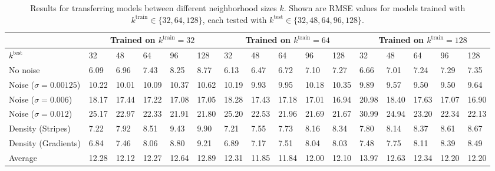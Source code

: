 \documentclass[10pt,twocolumn,letterpaper]{article}
\begin{document}
\begin{table*}[t]
\small
\setlength\tabcolsep{3.5pt}
\centering
\begin{tabular}{llllll|lllll|lllll}
\toprule
& \multicolumn{5}{c}{Trained on $k^{\textrm{train}} = 32$} & \multicolumn{5}{c}{Trained on $k^{\textrm{train}} = 64$} & \multicolumn{5}{c}{Trained on $k^{\textrm{train}} = 128$} \\
\midrule
$k^{\textrm{test}}$ & 32  &  48  & 64 & 96 & 128 & 32  &  48  & 64 & 96 & 128 & 32  &  48  & 64 & 96 & 128  \\ 
\midrule
No noise  & 6.09 &  6.96 & 7.43 & 8.25 & 8.77 & 6.13  & 6.47 & 6.72 & 7.10 & 7.27 & 6.66 &  7.01 & 7.24 & 7.29 & 7.35 \\ 
Noise ($\sigma = 0.00125$)  & 10.22 & 10.01  & 10.09 & 10.37 & 10.62 & 10.19 &  9.93 & 9.95 & 10.18  & 10.35 & 9.89  & 9.57 & 9.50 & 9.50 & 9.64 \\ 
Noise ($\sigma = 0.006$)   & 18.17 & 17.44 & 17.22 & 17.08 & 17.05 & 18.28 & 17.43 & 17.18 & 17.01 & 16.94 & 20.98 & 18.40 & 17.63 & 17.07 & 16.90 \\ 
Noise ($\sigma = 0.012$) & 25.17 & 22.97 & 22.33 & 21.91 & 21.80 & 25.20 & 22.53 & 21.96 & 21.69  & 21.67 & 30.99 & 24.94 & 23.20 & 22.34 &  22.13 \\ 
Density (Stripes)   &  7.22 & 7.92 & 8.51  & 9.43 & 9.90 & 7.21  & 7.55  &  7.73 & 8.16  &  8.34 &  7.80 & 8.14 &  8.37 & 8.61  & 8.67\\
Density (Gradients)   & 6.84 & 7.46 & 8.06 & 8.80 & 9.21 & 6.89 & 7.17 & 7.51 & 8.04  & 8.03 & 7.48 & 7.75 & 8.11 & 8.39 & 8.49 \\ 
\midrule
Average    & 12.28 & 12.12  & 12.27 & 12.64 & 12.89 & 12.31 & 11.85 & 11.84 & 12.00  & 12.10 & 13.97 & 12.63  & 12.34 & 12.20 & 12.20 \\ 
\bottomrule
\end{tabular}
\caption{Results for transferring models between different neighborhood sizes $k$. Shown are RMSE values for models trained with $k^{\textrm{train}} \in \{32, 64, 128\}$, each tested with $k^{\textrm{test}} \in \{32, 48, 64, 96, 128\}$.}
\label{tab:transfer}
\end{table*}
\end{document}
